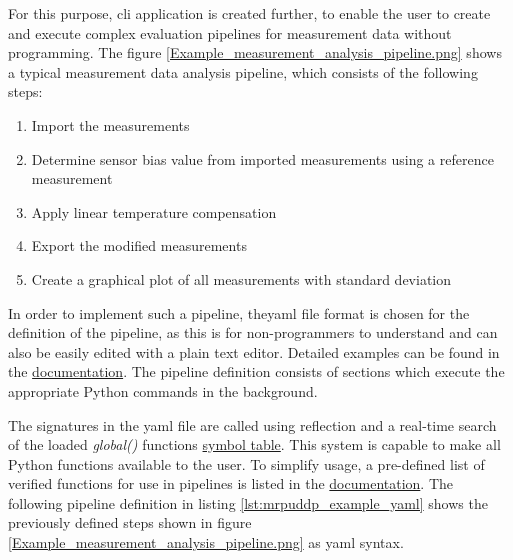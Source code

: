 For this purpose, \gls{cli} application is created further, to enable
the user to create and execute complex evaluation pipelines for
measurement data without programming. The figure
\ref{Example_measurement_analysis_pipeline.png} shows a typical
measurement data analysis pipeline, which consists of the following
steps:

\begin{enumerate}
\def\labelenumi{\arabic{enumi}.}
\tightlist
\item
  Import the measurements
\item
  Determine sensor bias value from imported measurements using a
  reference measurement
\item
  Apply linear temperature compensation
\item
  Export the modified measurements
\item
  Create a graphical plot of all measurements with standard deviation
\end{enumerate}

In order to implement such a pipeline, the\gls{yaml} file format is
chosen for the definition of the pipeline, as this is for
non-programmers to understand and can also be easily edited with a plain
text editor. Detailed examples can be found in the
\href{https://magneticreadoutprocessing.readthedocs.io/en/latest/}{documentation}.
The pipeline definition consists of sections which execute the
appropriate Python commands in the background.

The signatures in the \gls{yaml} file are called using reflection and a
real-time search of the loaded \emph{global()} functions
\href{https://docs.python.org/3/library/functions.html#globals}{symbol table}.
This system is capable to make all Python functions available to the
user. To simplify usage, a pre-defined list of verified functions for
use in pipelines is listed in the
\href{https://magneticreadoutprocessing.readthedocs.io/en/latest/}{documentation}.
The following pipeline definition in listing
\ref{lst:mrpuddp_example_yaml} shows the previously defined steps shown
in figure \ref{Example_measurement_analysis_pipeline.png} as \gls{yaml}
syntax.

